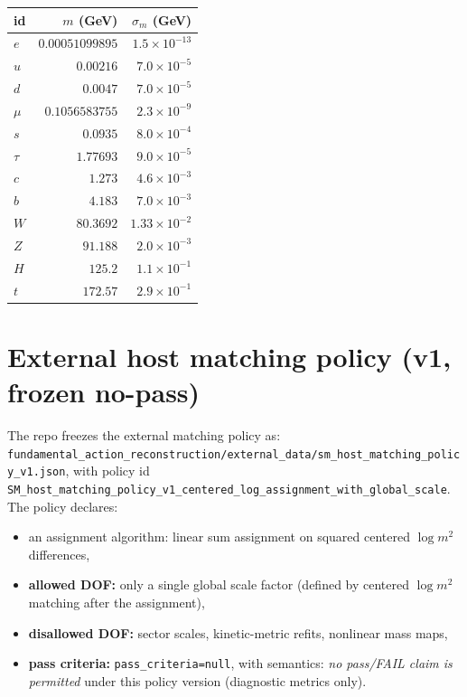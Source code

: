 \documentclass[11pt,a4paper]{article}
\begin{document}
\begin{center}
\begin{tabular}{lrr}
\toprule
id & $m$ (GeV) & $\sigma_m$ (GeV)\\
\midrule
$e$ & $0.00051099895$ & $1.5\times 10^{-13}$\\
$u$ & $0.00216$ & $7.0\times 10^{-5}$\\
$d$ & $0.0047$ & $7.0\times 10^{-5}$\\
$\mu$ & $0.1056583755$ & $2.3\times 10^{-9}$\\
$s$ & $0.0935$ & $8.0\times 10^{-4}$\\
$\tau$ & $1.77693$ & $9.0\times 10^{-5}$\\
$c$ & $1.273$ & $4.6\times 10^{-3}$\\
$b$ & $4.183$ & $7.0\times 10^{-3}$\\
$W$ & $80.3692$ & $1.33\times 10^{-2}$\\
$Z$ & $91.188$ & $2.0\times 10^{-3}$\\
$H$ & $125.2$ & $1.1\times 10^{-1}$\\
$t$ & $172.57$ & $2.9\times 10^{-1}$\\
\bottomrule
\end{tabular}
\end{center}

\section{External host matching policy (v1, frozen no-pass)}

The repo freezes the external matching policy as:
\verb|fundamental_action_reconstruction/external_data/sm_host_matching_policy_v1.json|,
with policy id \texttt{SM\_host\_matching\_policy\_v1\_centered\_log\_assignment\_with\_global\_scale}.
The policy declares:
\begin{itemize}
  \item an assignment algorithm: linear sum assignment on squared centered $\log m^2$ differences,
  \item \textbf{allowed DOF:} only a single global scale factor (defined by centered $\log m^2$ matching after the assignment),
  \item \textbf{disallowed DOF:} sector scales, kinetic-metric refits, nonlinear mass maps,
  \item \textbf{pass criteria:} \texttt{pass\_criteria=null}, with semantics: \emph{no pass/FAIL claim is permitted} under this policy version (diagnostic metrics only).
\end{itemize}
\end{document}

